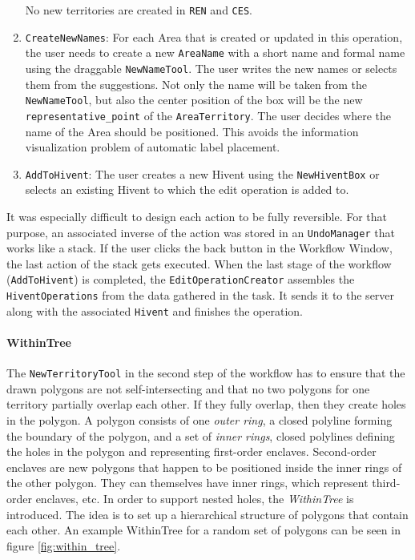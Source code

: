 \begin{enumerate}
\begin{itemize}
  \end{itemize}
  No new territories are created in \texttt{REN} and \texttt{CES}.

  \item \texttt{CreateNewNames}: For each Area that is created or updated in this operation, the user needs to create a new \texttt{AreaName} with a short name and formal name using the draggable \texttt{NewNameTool}. The user writes the new names or selects them from the suggestions. Not only the name will be taken from the \texttt{NewNameTool}, but also the center position of the box will be the new \texttt{representative\_point} of the \texttt{AreaTerritory}. The user decides where the name of the Area should be positioned. This avoids the information visualization problem of automatic label placement.

  \item \texttt{AddToHivent}: The user creates a new Hivent using the \texttt{NewHiventBox} or selects an existing Hivent to which the edit operation is added to.

\end{enumerate}

It was especially difficult to design each action to be fully reversible. For that purpose, an associated inverse of the action was stored in an \texttt{UndoManager} that works like a stack. If the user clicks the back button in the Workflow Window, the last action of the stack gets executed. When the last stage of the workflow (\texttt{AddToHivent}) is completed, the \texttt{EditOperationCreator} assembles the \texttt{HiventOperations} from the data gathered in the task. It sends it to the server along with the associated \texttt{Hivent} and finishes the operation.



\paragraph{WithinTree} %
\label{par:within_tree}

The \texttt{NewTerritoryTool} in the second step of the workflow has to ensure that the drawn polygons are not self-intersecting and that no two polygons for one territory partially overlap each other. If they fully overlap, then they create holes in the polygon. A polygon consists of one \emph{outer ring}, a closed polyline forming the boundary of the polygon, and a set of \emph{inner rings}, closed polylines defining the holes in the polygon and representing first-order enclaves. Second-order enclaves are new polygons that happen to be positioned inside the inner rings of the other polygon. They can themselves have inner rings, which represent third-order enclaves, etc. In order to support nested holes, the \emph{WithinTree} is introduced. The idea is to set up a hierarchical structure of polygons that contain each other. An example WithinTree for a random set of polygons can be seen in figure \ref{fig:within_tree}.

